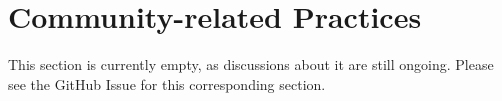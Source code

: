 \section{Community-related Practices}
\label{sec:comm}

This section is currently empty, as discussions about it are still ongoing. Please see the GitHub Issue for this corresponding section.
